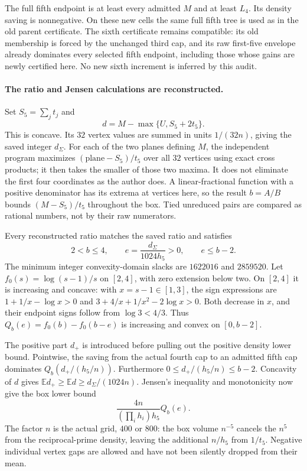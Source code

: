 The full fifth endpoint is at least every admitted $M$ and at least
$L_4$. Its density saving is nonnegative. On these new cells the same
full fifth tree is used as in the old parent certificate. The sixth
certificate remains compatible: its old membership is forced by the
unchanged third cap, and its raw first-five envelope already dominates
every selected fifth endpoint, including those whose gains are newly
certified here. No new sixth increment is inferred by this audit.

\paragraph{The ratio and Jensen calculations are reconstructed.}
Set $S_5=\sum_jt_j$ and
\[
 d=M-\max\{U,S_5+2t_5\}.
\]
This is concave. Its $32$ vertex values are summed in units $1/(32n)$,
giving the saved integer $d_\Sigma$. For each of the two planes defining
$M$, the independent program maximizes $(\text{plane}-S_5)/t_5$
over all $32$ vertices using exact cross products; it then takes the
smaller of those two maxima. It does not eliminate the first four
coordinates as the author does. A linear-fractional function with a
positive denominator has its extrema at vertices here, so the result
$b=A/B$ bounds $(M-S_5)/t_5$ throughout the box. Tied unreduced pairs
are compared as rational numbers, not by their raw numerators.

Every reconstructed ratio matches the saved ratio and satisfies
\[
 2<b\le4,\qquad e=\frac{d_\Sigma}{1024h_5}>0,
 \qquad e\le b-2.
\]
The minimum integer convexity-domain slacks are $1622016$ and $2859520$.
Let $f_0(s)=\log(s-1)/s$ on $[2,4]$, with zero extension below two.
On $[2,4]$ it is increasing and concave: with $x=s-1\in[1,3]$, the
sign expressions are $1+1/x-\log x>0$ and
$3+4/x+1/x^2-2\log x>0$. Both decrease in $x$, and their endpoint
signs follow from $\log3<4/3$. Thus
$Q_b(e)=f_0(b)-f_0(b-e)$ is increasing and convex on $[0,b-2]$.

The positive part $d_+$ is introduced before pulling out the positive
density lower bound. Pointwise, the saving from the actual fourth cap
to an admitted fifth cap dominates $Q_b(d_+/(h_5/n))$.
Furthermore $0\le d_+/(h_5/n)\le b-2$. Concavity of $d$ gives
$\mathbb E d_+\ge\mathbb E d\ge d_\Sigma/(1024n)$.
Jensen's inequality and monotonicity now give the box lower bound
\[
 \frac{4n}{(\prod_i h_i)h_5}Q_b(e).
\]
The factor $n$ is the actual grid, $400$ or $800$: the box volume
$n^{-5}$ cancels the $n^5$ from the reciprocal-prime density, leaving
the additional $n/h_5$ from $1/t_5$. Negative individual vertex gaps
are allowed and have not been silently dropped from their mean.

